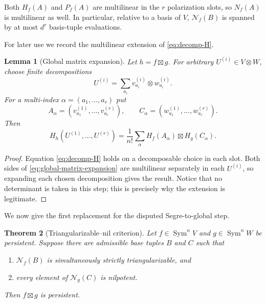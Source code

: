 \documentclass[11pt]{amsart}
\newtheorem{theorem}{Theorem}[section]
\newtheorem{lemma}[theorem]{Lemma}
\newcommand{\Sym}{\operatorname{Sym}}
\newcommand{\boxt}{\mathbin{\boxtimes}}
\newcommand{\Nsp}{\mathcal N}
\begin{document}
Both $H_f(A)$ and $P_f(A)$ are multilinear in the $r$ polarization slots, so
$N_f(A)$ is multilinear as well.  In particular, relative to a basis of $V$,
$\Nsp_f(B)$ is spanned by at most $d^r$ basis-tuple evaluations.

For later use we record the multilinear extension of
\eqref{eq:decomp-H}.

\begin{lemma}[Global matrix expansion]\label{lem:matrix-expansion}
Let $h=f\boxt g$.  For arbitrary
$U^{(i)}\in V\otimes W$, choose finite decompositions
\[
 U^{(i)}=\sum_{a_i}v^{(i)}_{a_i}\otimes w^{(i)}_{a_i}.
\]
For a multi-index $\alpha=(a_1,\ldots,a_r)$ put
\[
 A_\alpha=(v^{(1)}_{a_1},\ldots,v^{(r)}_{a_r}),\qquad
 C_\alpha=(w^{(1)}_{a_1},\ldots,w^{(r)}_{a_r}).
\]
Then
\begin{equation}\label{eq:global-matrix-expansion}
 H_h(U^{(1)},\ldots,U^{(r)})
 =\frac1{n!}\sum_\alpha H_f(A_\alpha)\boxt H_g(C_\alpha).
\end{equation}
\end{lemma}

\begin{proof}
Equation \eqref{eq:decomp-H} holds on a decomposable choice in each slot.
Both sides of \eqref{eq:global-matrix-expansion} are multilinear separately in
each $U^{(i)}$, so expanding each chosen decomposition gives the result.
Notice that no determinant is taken in this step; this is precisely why the
extension is legitimate.
\end{proof}

We now give the first replacement for the disputed Segre-to-global step.

\begin{theorem}[Triangularizable--nil criterion]\label{thm:TNil}
Let $f\in\Sym^n V$ and $g\in\Sym^n W$ be persistent.  Suppose there are
admissible base tuples $B$ and $C$ such that
\begin{enumerate}[label=(\alph*)]
\item $\Nsp_f(B)$ is simultaneously strictly triangularizable, and
\item every element of $\Nsp_g(C)$ is nilpotent.
\end{enumerate}
Then $f\boxt g$ is persistent.
\end{theorem}
\end{document}
